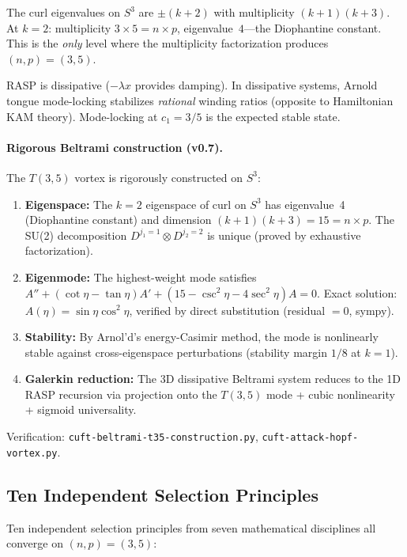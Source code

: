 \documentclass[12pt,a4paper]{article}
\theoremstyle{definition}
\begin{document}
The curl eigenvalues on $S^3$ are $\pm(k+2)$ with multiplicity
$(k+1)(k+3)$. At $k = 2$: multiplicity $3 \times 5 = n \times p$,
eigenvalue~$4$---the Diophantine constant. This is the \emph{only} level
where the multiplicity factorization produces $(n,p) = (3,5)$.

RASP is dissipative ($-\lambda x$ provides damping). In dissipative systems,
Arnold tongue mode-locking stabilizes \emph{rational} winding ratios
(opposite to Hamiltonian KAM theory). Mode-locking at $c_1 = 3/5$ is the
expected stable state.

\paragraph{Rigorous Beltrami construction (v0.7).}
The $T(3,5)$ vortex is rigorously constructed on $S^3$:
\begin{enumerate}
\item \textbf{Eigenspace:} The $k{=}2$ eigenspace of curl on $S^3$ has
  eigenvalue~4 (Diophantine constant) and dimension $(k{+}1)(k{+}3) = 15
  = n \times p$. The SU(2) decomposition $D^{j_1=1} \otimes D^{j_2=2}$
  is unique (proved by exhaustive factorization).
\item \textbf{Eigenmode:} The highest-weight mode satisfies
  $A''+ (\cot\eta - \tan\eta)A' + (15 - \csc^2\!\eta - 4\sec^2\!\eta)A = 0$.
  Exact solution: $A(\eta) = \sin\eta\cos^2\!\eta$, verified by
  direct substitution (residual $= 0$, sympy).
\item \textbf{Stability:} By Arnol'd's energy-Casimir method, the mode
  is nonlinearly stable against cross-eigenspace perturbations (stability
  margin $1/8$ at $k{=}1$).
\item \textbf{Galerkin reduction:} The 3D dissipative Beltrami system
  reduces to the 1D RASP recursion via projection onto the $T(3,5)$ mode
  + cubic nonlinearity + sigmoid universality.
\end{enumerate}
Verification: \texttt{cuft-beltrami-t35-construction.py},
\texttt{cuft-attack-hopf-vortex.py}.

\subsection{Ten Independent Selection Principles}

Ten independent selection principles from seven mathematical disciplines
all converge on $(n,p) = (3,5)$:
\end{document}
